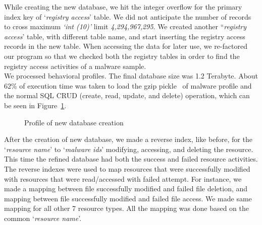 While creating the new database, we hit the integer overflow for the primary index key of `\emph{registry access}' table.
We did not anticipate the number of records to cross maximum \emph{`int (10)'} limit \emph{4,294,967,295}.
We created another ``\emph{registry access}' table, with different table name, and start inserting the registry access records in the new table.
When accessing the data for later use, we re-factored our program so that we checked both the registry tables in order to find the registry access activities of a malware sample.\\

We processed \gettotalmalwareii{} behavioral profiles.
The final database size was 1.2 Terabyte.
About $62\%$ of execution time was taken to load the gzip pickle~\cite[]{pythonpickle} of malware profile and the normal SQL CRUD (create, read, update, and delete) operation, which can be seen in Figure~\ref{fig:dbcreation}.\\
\begin{figure}[ht]
    \centering
    \def\svgwidth{\columnwidth}
    \scalebox{0.99}{}
\caption{Profile of new database creation}
\label{fig:dbcreation}
\end{figure}

After the creation of new database, we made a reverse index, like before, for the `\emph{resource name}' to `\emph{malware ids}' modifying, accessing, and deleting the resource.
This time the refined database had both the success and failed resource activities.
The reverse indexes were used to map resources that were successfully modified with resources that were read/accessed with failed attempt.
For instance, we made a mapping between file successfully modified and failed file deletion, and mapping between file successfully modified and failed file access.
We made same mapping for all other 7 resource types.
All the mapping was done based on the common `\emph{resource name}'.\\

